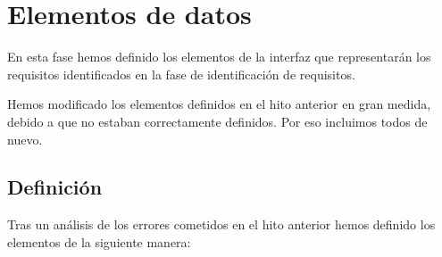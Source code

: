 \section{Elementos de datos}

En esta fase hemos definido los elementos de la interfaz que representarán los
requisitos identificados en la fase de identificación de requisitos.

Hemos modificado los elementos definidos en el hito anterior en gran medida, debido a que no
estaban correctamente definidos. Por eso incluimos todos de nuevo.

\subsection{Definición}

Tras un análisis de los errores cometidos en el hito anterior hemos definido los elementos
de la siguiente manera:

